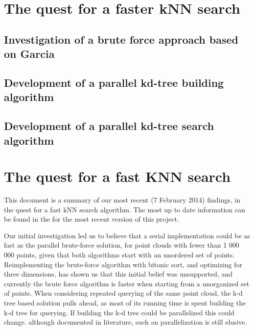 
\section{The quest for a faster kNN search} %
\label{sec:the_quest_for_a_faster_knn_search}

\subsection{Investigation of a brute force approach based on Garcia} %
\label{sub:investigation_of_a_brute_force_approach_based_on_garcia}


\subsection{Development of a parallel kd-tree building algorithm} %
\label{sub:development_of_a_parallel_kd_tree_building_algorithm}


\subsection{Development of a parallel kd-tree search algorithm} %
\label{sub:development_of_a_parallel_kd_tree_search_algorithm}


\section{The quest for a fast KNN search} %
\label{sec:the_quest_for_a_fast_KNN_search}

This document is a summary of our most recent (7 February 2014) findings, in the quest for a fast kNN search algorithm. The most up to date information can be found in the 
for the most recent version of this project.

Our initial investigation led us to believe that a serial implementation could be as fast as the parallel brute-force solution, for point clouds with fewer than 1 000 000 points, given that both algorithms start with an unordered set of points. Reimplementing the brute-force algorithm with bitonic sort, and optimizing for three dimensions, has shown us that this initial belief was unsupported, and currently the brute force algorithm is faster when starting from a unorganized set of points. When considering repeated querying of the same point cloud, the k-d tree based solution pulls ahead, as most of its running time is spent building the k-d tree for querying. If building the k-d tree could be parallelized this could change. although documented in literature, such an parallelization is still elusive.

